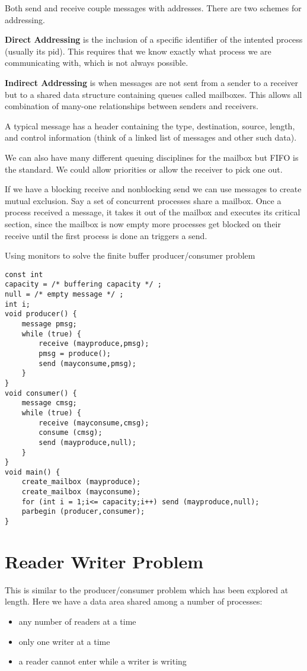 \documentclass[12pt]{article}
\begin{document}
Both send and receive couple messages with addresses. There are two schemes for addressing.

\textbf{Direct Addressing} is the inclusion of a specific identifier of the intented process (usually its pid). This requires that we know exactly what process we are communicating with, which is not always possible.

\textbf{Indirect Addressing} is when messages are not sent from a sender to a receiver but to a shared data structure containing queues called mailboxes. This allows all combination of many-one relationships between senders and receivers.

A typical message has a header containing the type, destination, source, length, and control information (think of a linked list of messages and other such data).

We can also have many different queuing disciplines for the mailbox but FIFO is the standard. We could allow priorities or allow the receiver to pick one out.

If we have a blocking receive and nonblocking send we can use messages to create mutual exclusion. Say a set of concurrent processes share a mailbox. Once a process received a message, it takes it out of the mailbox and executes its critical section, since the mailbox is now empty more processes get blocked on their receive until the first process is done an triggers a send.

Using monitors to solve the finite buffer producer/consumer problem
\begin{lstlisting}
const int
capacity = /* buffering capacity */ ;
null = /* empty message */ ;
int i;
void producer() {
    message pmsg;
    while (true) {
        receive (mayproduce,pmsg);
        pmsg = produce();
        send (mayconsume,pmsg);
    }
}
void consumer() {
    message cmsg;
    while (true) {
        receive (mayconsume,cmsg);
        consume (cmsg);
        send (mayproduce,null);
    }
}
void main() {
    create_mailbox (mayproduce);
    create_mailbox (mayconsume);
    for (int i = 1;i<= capacity;i++) send (mayproduce,null);
    parbegin (producer,consumer);
}
\end{lstlisting}

\section{Reader Writer Problem}
This is similar to the producer/consumer problem which has been explored at length. Here we have a data area shared among a number of processes:
\begin{itemize}
    \item any number of readers at a time
    \item only one writer at a time
    \item a reader cannot enter while a writer is writing
\end{itemize}
\end{document}
